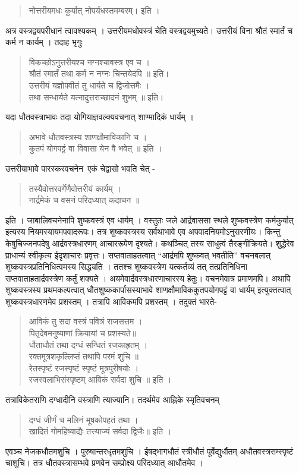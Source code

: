 {\begin{verse}
नोत्तरीयमधः कुर्यात् नोपर्यधस्तमम्बरम्। इति । 
\end{verse}
अत्र वस्त्रद्वयपरीधानं त्वावश्यकम् । उत्तरीयमधोवस्त्रं चेति वस्त्रद्वयमुच्यते। उत्तरीयं विना श्रौतं स्मार्तं च कर्म न कार्यम् । तदाह भृगुः \ 
\begin{verse}
विकच्छोऽनुत्तरीयश्च नग्नश्चावस्त्र एव च । \\
श्रौतं स्मार्तं तथा कर्म न नग्नः चिन्तयेदपि ॥ इति। \\
उत्तरीयं यज्ञोपवीतं तु  धार्यते च द्विजोत्तमैः । \\
तथा सन्धार्यते यत्नादुत्तराच्छादनं शुभम् ॥ इति। 
\end{verse}
यदा धौतवस्त्राभावः तदा योगियाज्ञवल्क्यवचनात् शाण्मादिकं धार्यम् । 
\begin{verse}
अभावे धौतवस्त्रस्य शाणक्षौमाविकानि च ।\\
कुतपं योगपट्टं वा विवासा येन वै भवेत् ॥ इति । 
\end{verse}
उत्तरीयाभावे पारस्करवचनेन\ एकं चेद्वासो भवति चेत् -
\begin{verse}
तस्यैवोत्तरवर्गेणैवोत्तरीयं कार्यम् । \\
नार्द्रमेकं च वसनं परिदध्यात् कदाचन ॥ 
\end{verse}
इति । जाबालिवचनेनापि शुष्कवस्त्रं एव धार्यम् । वस्तुतः जले आर्द्रवाससा स्थले शुष्कवस्त्रेण कर्मकुर्यात् इत्यस्य नियमस्यायमपवादरूपः। तत्र शुष्कवस्त्रस्य सर्वथाभावे एव अपवादनियमोऽनुसरणीयः। किन्तु केषुचिज्जनपदेषु आर्द्रवस्त्रधारणम् आचाररूपेण दृश्यते। कथञ्चित् तस्य साधुत्वं तैरङ्गीक्रियते। शुद्धेरेव प्राधान्यं स्वीकृत्य ईदृशाचारः प्रवृत्तः। सप्तवाताहतत्वात् “आर्द्रमपि शुष्कवत् भवतीति” वचनबलात् शुष्कवस्त्रप्रतिनिधित्वमस्य सिद्ध्यति । ततश्च शुष्कवस्त्रेण यत्कर्तव्यं तत् तत्प्रतिनिधिना सप्तवाताहतार्द्रवस्त्रेण कर्तुं शक्यते । अयमेवार्द्रवस्त्रधारणाचारस्य हेतुः। वचनमेवात्र प्रमाणमपि। अथापि शुष्कवस्त्रस्य प्रथमकल्पत्वात् धौतशुष्ककार्पासस्याभावे शाणक्षौमाविककुतपयोगपट्टं वा धार्यम् इत्युक्तत्वात् शुष्कवस्त्रधारणमेव प्रशस्तम् । तत्रापि आविकमपि प्रशस्तम् । तदुक्तं भारते- 
\begin{verse}
आविकं तु सदा वस्त्रं पवित्रं राजसत्तम । \\
पितृदेवमनुष्याणां क्रियायां च प्रशस्यते॥ \\
धौताधौतं तथा दग्धं सन्धितं रजकाहृतम् । \\
रक्तमूत्रशकृल्लिप्तं तथापि परमं शुचि ॥\\
रेतस्पृष्टं रजस्पृष्टं स्पृष्टं मूत्रपुरीषयोः ।\\
रजस्वलाभिसंस्पृष्टम् आविकं सर्वदा शुचि ॥ इति ।
\end{verse}
तत्राविकेतराणि दग्धादीनि वस्त्राणि त्याज्यानि। तदर्थमेव आह्निके स्मृतिवचनम् 
\begin{verse}
दग्धं जीर्णं च मलिनं मूषकोपहतं तथा । \\
खादितं गोमहिष्याद्यैः तत्त्याज्यं सर्वदा द्विजैः॥ इति । 
\end{verse}
एवञ्च नेजकधौतमशुचि । पुरुषान्तरधृतमशुचि । ईषद्भागधौतं स्त्रीधौतं पूर्वेद्युर्धौतम् अधौतवस्त्रसम्स्पृष्टं चाशुचि। तत्र धौतवस्त्रासम्भवे प्रणवेन सम्प्रोक्ष्य परिदध्यात् आधौतमेव । 

}
